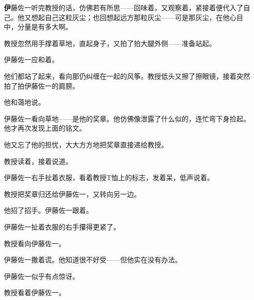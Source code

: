 
\AddSymbolsF
\pagecolor{ForestGreen!15!Gray!}
\color{white}
\quad\quad \lettrine[,lraise=0.2,lhang=0.5]
{\textbf{伊}}{藤}佐一听完教授的话，仿佛若有所思——回味着，又观察着，紧接着便代入了自己。他又想起自己这粒灰尘；也回想起远方那粒灰尘——可是那灰尘，在他心目中，分量是有多大啊。

教授忽然用手撑着草地，直起身子，又拍了拍大腿外侧——准备站起。

伊藤佐一应和着。

他们都站了起来，看向那仍纠缠在一起的风筝。教授低头又擦了擦眼镜，接着突然拍了拍伊藤佐一的肩膀。

他和蔼地说。

伊藤佐一看向草地——是他的奖章。他仿佛像泄露了什么似的，连忙弯下身捡起。他才再次发现上面的铭文。


他又忘了他的担忧，大大方方地把奖章直接递给教授。


教授读着，接着说道。


伊藤佐一右手扯着衣服，看着教授T恤上的标志，发着呆，低声说着。


教授把奖章归还给伊藤佐一，又转向另一边。

他招了招手。伊藤佐一跟着。


伊藤佐一扯着衣服的右手攥得更紧了。

教授看向伊藤佐一。

伊藤佐一撒着谎。他知道很不好受——但他实在没有办法。


伊藤佐一似乎有点惊讶。

教授看着伊藤佐一。

